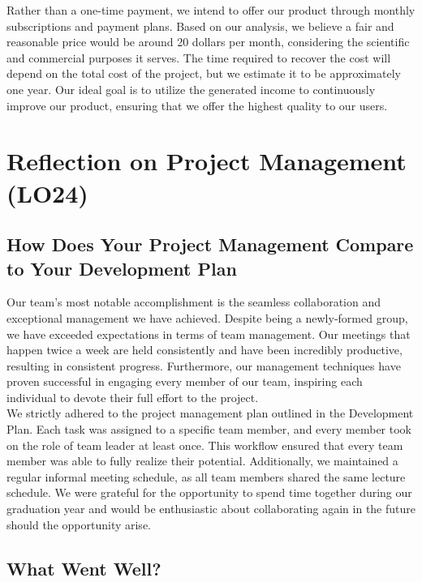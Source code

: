 \documentclass{article}
\begin{document}
\noindent Rather than a one-time payment, we intend to offer our product through monthly subscriptions and payment plans. Based on our analysis, we believe a fair and reasonable price would be around 20 dollars per month, considering the scientific and commercial purposes it serves. The time required to recover the cost will depend on the total cost of the project, but we estimate it to be approximately one year. Our ideal goal is to utilize the generated income to continuously improve our product, ensuring that we offer the highest quality to our users.

\section{Reflection on Project Management (LO24)}


\subsection{How Does Your Project Management Compare to Your Development Plan}

\noindent Our team's most notable accomplishment is the seamless collaboration and exceptional management we have achieved. Despite being a newly-formed group, we have exceeded expectations in terms of team management. Our meetings that happen twice a week are held consistently and have been incredibly productive, resulting in consistent progress. Furthermore, our management techniques have proven successful in engaging every member of our team, inspiring each individual to devote their full effort to the project. \\

\noindent We strictly adhered to the project management plan outlined in the Development Plan. Each task was assigned to a specific team member, and every member took on the role of team leader at least once. This workflow ensured that every team member was able to fully realize their potential. Additionally, we maintained a regular informal meeting schedule, as all team members shared the same lecture schedule. We were grateful for the opportunity to spend time together during our graduation year and would be enthusiastic about collaborating again in the future should the opportunity arise.\\

\subsection{What Went Well?}
\end{document}

